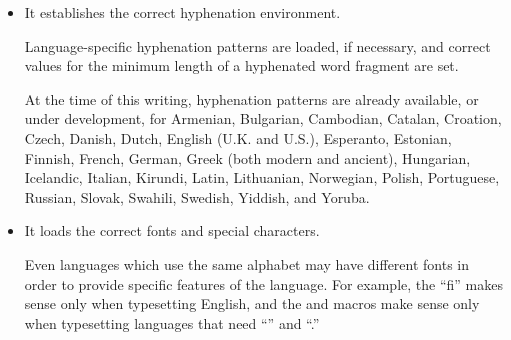 \begin{itemize}
  \item It establishes the correct hyphenation 
  environment.

        Language-specific hyphenation patterns are loaded, if necessary,
        and correct values for the minimum length of a hyphenated
        word fragment are set.

        At the time of this writing, hyphenation patterns are already
        available, or under development, for Armenian, Bulgarian,
        Cambodian, Catalan, Croation, Czech, Danish, Dutch, English
        (U.K. and U.S.), Esperanto, Estonian, Finnish, French, German,
        Greek (both modern and ancient), Hungarian, Icelandic,
        Italian, Kirundi, Latin, Lithuanian, Norwegian, Polish,
        Portuguese, Russian, Slovak, Swahili, Swedish, Yiddish, and
        Yoruba.

  \item It loads the correct fonts and special characters.

        Even languages which use the same alphabet may have different
        fonts
        in order to provide specific features of the language.
        For example, the ``fi''  makes 
        sense only when typesetting
        English, and the  and  macros 
        make sense only when typesetting languages that need 
        ``{\dcr{}}'' and ``{\dcr{}}.''


\end{itemize}
